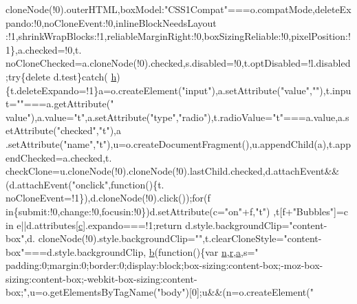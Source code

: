\begin{DoxyCode}
      cloneNode(!0).outerHTML,boxModel:\textcolor{stringliteral}{"CSS1Compat"}===o.compatMode,deleteExpando:!0,noCloneEvent:!0,inlineBlockNeedsLayout
      :!1,shrinkWrapBlocks:!1,reliableMarginRight:!0,boxSizingReliable:!0,pixelPosition:!1\},a.checked=!0,t.
      noCloneChecked=a.cloneNode(!0).checked,s.disabled=!0,t.optDisabled=!l.disabled;\textcolor{keywordflow}{try}\{\textcolor{keyword}{delete} d.test\}\textcolor{keywordflow}{catch}(
      \hyperlink{jquery-migrate-1_82_81_8min_8js_a79fe0eb780a2a4b5543b4dddf8b6188a}{h})\{t.deleteExpando=!1\}a=o.createElement(\textcolor{stringliteral}{"input"}),a.setAttribute(\textcolor{stringliteral}{"value"},\textcolor{stringliteral}{""}),t.input=\textcolor{stringliteral}{""}===a.getAttribute(\textcolor{stringliteral}{"
      value"}),a.value=\textcolor{stringliteral}{"t"},a.setAttribute(\textcolor{stringliteral}{"type"},\textcolor{stringliteral}{"radio"}),t.radioValue=\textcolor{stringliteral}{"t"}===a.value,a.setAttribute(\textcolor{stringliteral}{"checked"},\textcolor{stringliteral}{"t"}),a
      .setAttribute(\textcolor{stringliteral}{"name"},\textcolor{stringliteral}{"t"}),u=o.createDocumentFragment(),u.appendChild(a),t.appendChecked=a.checked,t.
      checkClone=u.cloneNode(!0).cloneNode(!0).lastChild.checked,d.attachEvent&&(d.attachEvent(\textcolor{stringliteral}{"onclick"},\textcolor{keyword}{function}()\{t.
      noCloneEvent=!1\}),d.cloneNode(!0).click());\textcolor{keywordflow}{for}(f in\{submit:!0,change:!0,focusin:!0\})d.setAttribute(c=\textcolor{stringliteral}{"on"}+f,\textcolor{stringliteral}{"t"})
      ,t[f+\textcolor{stringliteral}{"Bubbles"}]=c in e||d.attributes[\hyperlink{jquery-1_89_81_8min_8js_a3fc7800392ca414b649cfe0282440252}{c}].expando===!1;\textcolor{keywordflow}{return} d.style.backgroundClip=\textcolor{stringliteral}{"content-box"},d.
      cloneNode(!0).style.backgroundClip=\textcolor{stringliteral}{""},t.clearCloneStyle=\textcolor{stringliteral}{"content-box"}===d.style.backgroundClip,
      \hyperlink{jquery-1_89_81_8min_8js_ac50ac660762310348a84d5558c651020}{b}(\textcolor{keyword}{function}()\{var \hyperlink{root_2static_2root_2js_2bootstrap_2jquery-ui-1_810_84_8custom_8min_8js_afc984c4f6c68ce30a0af99006f5f8d27}{n},\hyperlink{prism_8js_a514f1b439f404f86f77090fa9edc96ce}{r},\hyperlink{root_2static_2root_2js_2bootstrap_2bootstrap_8min_8js_ae8f6b400ed3390908c5cdeebed3a82b9}{a},s=\textcolor{stringliteral}{"
      padding:0;margin:0;border:0;display:block;box-sizing:content-box;-moz-box-sizing:content-box;-webkit-box-sizing:content-box;"},u=o.getElementsByTagName(\textcolor{stringliteral}{"body"})[0];u&&(n=o.createElement(\textcolor{stringliteral}{"
}
\end{DoxyCode}
